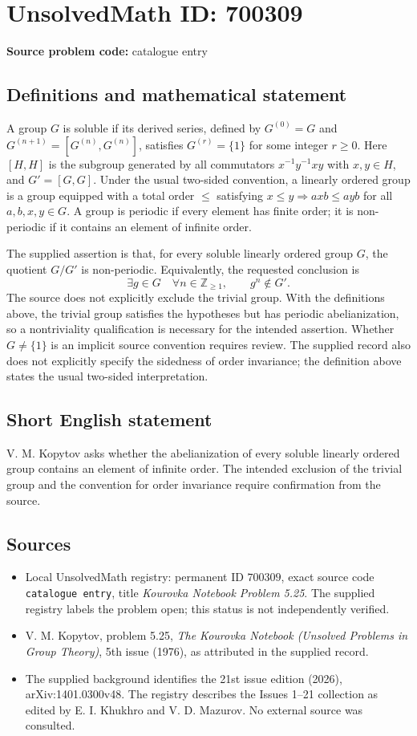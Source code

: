\documentclass[11pt]{article}
\newcommand{\Z}{\mathbb{Z}}
\begin{document}
\section*{UnsolvedMath ID: 700309}
\textbf{Source problem code:} catalogue entry
\subsection{Definitions and mathematical statement}
A group \(G\) is soluble if its derived series, defined by \(G^{(0)}=G\) and \(G^{(n+1)}=[G^{(n)},G^{(n)}]\), satisfies \(G^{(r)}=\{1\}\) for some integer \(r\geq 0\). Here \([H,H]\) is the subgroup generated by all commutators \(x^{-1}y^{-1}xy\) with \(x,y\in H\), and \(G'=[G,G]\). Under the usual two-sided convention, a linearly ordered group is a group equipped with a total order \(\leq\) satisfying \(x\leq y\Longrightarrow axb\leq ayb\) for all \(a,b,x,y\in G\). A group is periodic if every element has finite order; it is non-periodic if it contains an element of infinite order.

The supplied assertion is that, for every soluble linearly ordered group \(G\), the quotient \(G/G'\) is non-periodic. Equivalently, the requested conclusion is
\[
\exists g\in G\quad\forall n\in\Z_{\geq 1},\qquad g^n\notin G'.
\]
The source does not explicitly exclude the trivial group. With the definitions above, the trivial group satisfies the hypotheses but has periodic abelianization, so a nontriviality qualification is necessary for the intended assertion. Whether \(G\neq\{1\}\) is an implicit source convention requires review. The supplied record also does not explicitly specify the sidedness of order invariance; the definition above states the usual two-sided interpretation.
\subsection{Short English statement}
V. M. Kopytov asks whether the abelianization of every soluble linearly ordered group contains an element of infinite order. The intended exclusion of the trivial group and the convention for order invariance require confirmation from the source.
\subsection{Sources}
\begin{itemize}
\item Local UnsolvedMath registry: permanent ID \(700309\), exact source code \texttt{catalogue entry}, title \emph{Kourovka Notebook Problem 5.25}. The supplied registry labels the problem open; this status is not independently verified.
\item V. M. Kopytov, problem 5.25, \emph{The Kourovka Notebook (Unsolved Problems in Group Theory)}, 5th issue (1976), as attributed in the supplied record.
\item The supplied background identifies the 21st issue edition (2026), arXiv:1401.0300v48. The registry describes the Issues 1--21 collection as edited by E. I. Khukhro and V. D. Mazurov. No external source was consulted.
\end{itemize}
\end{document}
